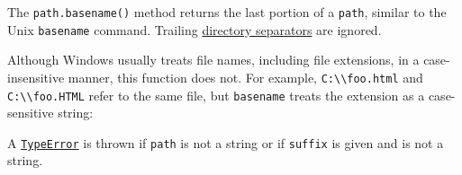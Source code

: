 The \texttt{path.basename()} method returns the last portion of a
\texttt{path}, similar to the Unix \texttt{basename} command. Trailing
\hyperref[pathsep]{directory separators} are ignored.

\begin{Shaded}
\begin{Highlighting}[]
\NormalTok{(}\NormalTok{)}\OperatorTok{;}

\NormalTok{(}\OperatorTok{,} \NormalTok{)}\OperatorTok{;}
\end{Highlighting}
\end{Shaded}

Although Windows usually treats file names, including file extensions,
in a case-insensitive manner, this function does not. For example,
\texttt{C:\textbackslash{}\textbackslash{}foo.html} and
\texttt{C:\textbackslash{}\textbackslash{}foo.HTML} refer to the same
file, but \texttt{basename} treats the extension as a case-sensitive
string:

\begin{Shaded}
\begin{Highlighting}[]
\NormalTok{(}\SpecialCharTok{\textbackslash{}\textbackslash{}}\OperatorTok{,} \NormalTok{)}\OperatorTok{;}

\NormalTok{(}\SpecialCharTok{\textbackslash{}\textbackslash{}}\OperatorTok{,} \NormalTok{)}\OperatorTok{;}
\end{Highlighting}
\end{Shaded}

A \href{errors.md\#class-typeerror}{\texttt{TypeError}} is thrown if
\texttt{path} is not a string or if \texttt{suffix} is given and is not
a string.

